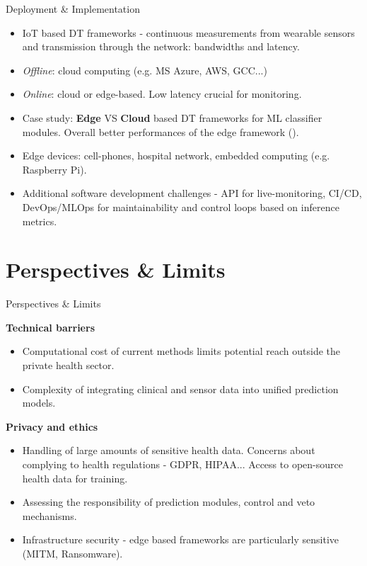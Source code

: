 \documentclass{beamer}
\begin{document}
\begin{frame}{Deployment \& Implementation}
  \begin{itemize}
    \item IoT based DT frameworks - continuous measurements from wearable sensors and transmission through the network: bandwidths and latency.
    \item \textit{Offline}: cloud computing (e.g. MS Azure, AWS, GCC...)
    \item \textit{Online}: cloud or edge-based. Low latency crucial for monitoring.
    \item Case study: \textbf{Edge} VS \textbf{Cloud} based DT frameworks for ML classifier modules. Overall better performances of the edge framework (\textcite{burak2023}).
    \item Edge devices: cell-phones, hospital network, embedded computing (e.g. Raspberry Pi).
    \item Additional software development challenges - API for live-monitoring, CI/CD, DevOps/MLOps for maintainability and control loops based on inference metrics.
  \end{itemize}
\end{frame}

\section{Perspectives \& Limits}

\begin{frame}{Perspectives \& Limits}
  
  \textbf{Technical barriers} 
  \begin{itemize}
    \item Computational cost of current methods limits potential reach outside the private health sector. 
    \item Complexity of integrating clinical and sensor data into unified prediction models.
  \end{itemize}
  \textbf{Privacy and ethics}
  \begin{itemize}
    \item Handling of large amounts of sensitive health data. Concerns about complying to health regulations - GDPR, HIPAA... Access to open-source health data for training.
    \item Assessing the responsibility of prediction modules, control and veto mechanisms.
    \item Infrastructure security - edge based frameworks are particularly sensitive (MITM, Ransomware).
  \end{itemize}
\end{frame}
\end{document}
